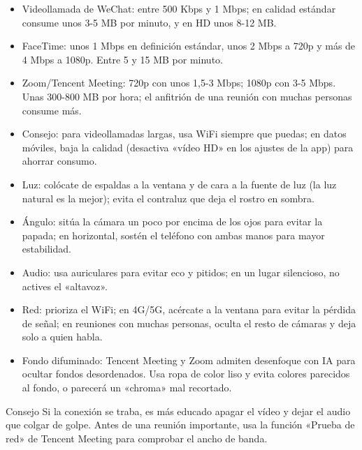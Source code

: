 
\begin{itemize}
  \item Videollamada de WeChat: entre 500 Kbps y 1 Mbps; en calidad estándar consume unos 3-5 MB por minuto, y en HD unos 8-12 MB.
  \item FaceTime: unos 1 Mbps en definición estándar, unos 2 Mbps a 720p y más de 4 Mbps a 1080p. Entre 5 y 15 MB por minuto.
  \item Zoom/Tencent Meeting: 720p con unos 1,5-3 Mbps; 1080p con 3-5 Mbps. Unas 300-800 MB por hora; el anfitrión de una reunión con muchas personas consume más.
  \item Consejo: para videollamadas largas, usa WiFi siempre que puedas; en datos móviles, baja la calidad (desactiva «vídeo HD» en los ajustes de la app) para ahorrar consumo.
\end{itemize}


\begin{itemize}
  \item Luz: colócate de espaldas a la ventana y de cara a la fuente de luz (la luz natural es la mejor); evita el contraluz que deja el rostro en sombra.
  \item Ángulo: sitúa la cámara un poco por encima de los ojos para evitar la papada; en horizontal, sostén el teléfono con ambas manos para mayor estabilidad.
  \item Audio: usa auriculares para evitar eco y pitidos; en un lugar silencioso, no actives el «altavoz».
  \item Red: prioriza el WiFi; en 4G/5G, acércate a la ventana para evitar la pérdida de señal; en reuniones con muchas personas, oculta el resto de cámaras y deja solo a quien habla.
  \item Fondo difuminado: Tencent Meeting y Zoom admiten desenfoque con IA para ocultar fondos desordenados. Usa ropa de color liso y evita colores parecidos al fondo, o parecerá un «chroma» mal recortado.
\end{itemize}

\begin{tcbinfo}{Consejo}
Si la conexión se traba, es más educado apagar el vídeo y dejar el audio que colgar de golpe. Antes de una reunión importante, usa la función «Prueba de red» de Tencent Meeting para comprobar el ancho de banda.

\end{tcbinfo}

